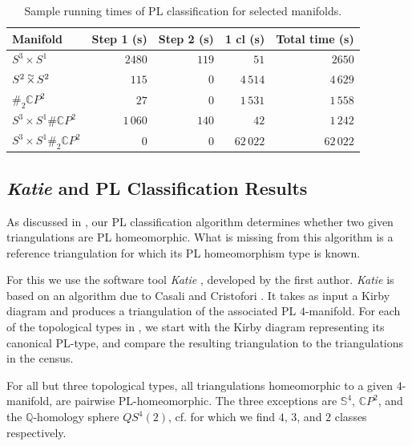 \documentclass[pdflatex,sn-mathphys-num]{sn-jnl}
\theoremstyle{thmstyleone}%
\theoremstyle{thmstyletwo}%
\theoremstyle{thmstylethree}%
\newcommand{\is}[1]{{\ttfamily\seqsplit{#1}}} %
\newcommand{\twprod}{\mathbin{
		\ooalign{\raise1.15ex\hbox{$\scriptstyle\sim$}\cr\hidewidth$\times$\hidewidth\cr}
}}
\newcommand{\cpp}{\mathbb{C}P^2}
\theoremstyle{remark}
\begin{document}

\begin{table}[h]
\caption{Sample running times of PL classification for selected manifolds.}
\label{tab:sampleRunningTimesPLClass}
\begin{tabular}{l|rrr|r}
\toprule
Manifold & Step 1 (s)& Step 2 (s)& 1 cl (s) & Total time (s) \\
\midrule
$S^3\times S^1$&$2480$&$119$&$51$&$2650$\\%
$S^2\twprod S^2$&$115$&$0$&$4\,514$&$4\,629$\\%
$\#_2\mathbb{C}P^2$&$27$&$0$&$1\,531$&$1\,558$\\%
$S^3\times S^1\#\mathbb{C}P^2$&$1\,060$&$140$&$42$&$1\,242$\\%
$S^3\times S^1\#_2\mathbb{C}P^2$&$0$&$0$&$62\,022$&$62\,022$\\%
\bottomrule
\end{tabular}
\end{table}

\subsection{{\em Katie} and PL Classification Results}\label{sec:katie+plRes}

As discussed in , our PL classification algorithm determines whether two given triangulations are PL homeomorphic. What is missing from this algorithm is a reference triangulation for which its PL homeomorphism type is known.

For this we use the software tool \emph{Katie} \cite{Katie,Burke-SoftwareJoCGver},  developed by the first author. \emph{Katie} is based on an algorithm due to Casali and Cristofori \cite{casaliCristofori2023Final}. It takes as input a Kirby diagram and produces a triangulation of the associated PL $4$-manifold. For each of the topological types in , we start with the Kirby diagram representing its canonical PL-type, and compare the resulting triangulation to the triangulations in the census. 

For all but three topological types, all triangulations homeomorphic to a given $4$-manifold, are pairwise PL-homeomorphic. The three exceptions are $\mathbb{S}^4$, $\cpp$, and the $\mathbb{Q}$-homology sphere $QS^4(2)$, cf.  for which we find $4$, $3$, and $2$ classes respectively.
\end{document}
